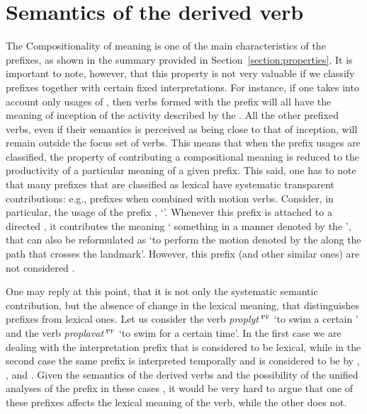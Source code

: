 \section{Semantics of the derived verb}\label{section:new:compositionality}
The Compositionality of meaning is one of the main characteristics of the  prefixes, as shown in the summary provided in Section~\ref{section:properties}. It is important to note, however, that this property is not very valuable if we classify prefixes together with certain fixed interpretations. For instance, if one takes into account only  usages of , then verbs formed with the  prefix  will all have the meaning of inception of the activity described by the . All the other prefixed verbs, even if their semantics is perceived as being close to that of inception, will remain outside the focus set of verbs. This means that when the prefix usages are classified, the property of contributing a compositional meaning is reduced to the productivity of a particular meaning of a given prefix. This said, one has to note that many prefixes that are classified as lexical have systematic transparent contributions: e.g.,  prefixes when combined with motion verbs. Consider, in particular, the  usage of the prefix , `'. Whenever this prefix is attached to a directed , it contributes the meaning ` something in a manner denoted by the ', that can also be reformulated as `to perform the motion denoted by the  along the path that crosses the landmark'. However, this prefix (and other similar ones) are not considered .

One may reply at this point, that it is not only the systematic semantic contribution, but the absence of change in the lexical meaning, that distinguishes  prefixes from lexical ones. Let us consider the verb \textit{proplyt'}$^{\textsc{pf}}$ `to swim a certain ' and the verb \textit{proplavat'}$^{\textsc{pf}}$ `to swim for a certain time'. In the first case we are dealing with the  interpretation prefix  that is considered to be lexical, while in the second case the same prefix is interpreted temporally and is considered to be  by \citet{Babko-Malaya:99}, \citet{Svenonius:04a}, and \citet{Svenonius:12}. Given the semantics of the derived verbs and the possibility of the unified analyses of the prefix  in these cases \citep{Kagan:book, ZinovaOsswald:paper}, it would be very hard to argue that one of these prefixes affects the lexical meaning of the verb, while the other does not. 


